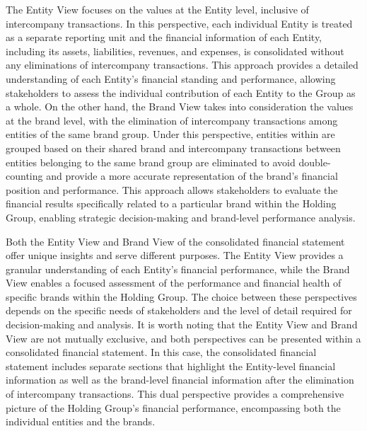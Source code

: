 \documentclass[12pt,a4paper,openright,twoside]{book}
\begin{document}
The Entity View focuses on the values at the Entity level, inclusive of intercompany transactions.
%
In this perspective, each individual Entity is treated as a separate reporting unit and the financial information of each Entity, including its assets, liabilities, revenues, and expenses, is consolidated without any eliminations of intercompany transactions. 
%
This approach provides a detailed understanding of each Entity's financial standing and performance, allowing stakeholders to assess the individual contribution of each Entity to the Group as a whole.
%
On the other hand, the Brand View takes into consideration the values at the brand level, with the elimination of intercompany transactions among entities of the same brand group. 
%
Under this perspective, entities within are grouped based on their shared brand and intercompany transactions between entities belonging to the same brand group are eliminated to avoid double-counting and provide a more accurate representation of the brand's financial position and performance. 
%
This approach allows stakeholders to evaluate the financial results specifically related to a particular brand within the Holding Group, enabling strategic decision-making and brand-level performance analysis.

Both the Entity View and Brand View of the consolidated financial statement offer unique insights and serve different purposes. 
%
The Entity View provides a granular understanding of each Entity's financial performance, while the Brand View enables a focused assessment of the performance and financial health of specific brands within the Holding  Group. 
%
The choice between these perspectives depends on the specific needs of stakeholders and the level of detail required for decision-making and analysis.
%
It is worth noting that the Entity View and Brand View are not mutually exclusive, and both perspectives can be presented within a consolidated financial statement. 
%
In this case, the consolidated financial statement includes separate sections that highlight the Entity-level financial information as well as the brand-level financial information after the elimination of intercompany transactions. 
%
This dual perspective provides a comprehensive picture of the Holding Group's financial performance, encompassing both the individual entities and the brands.
\end{document}
